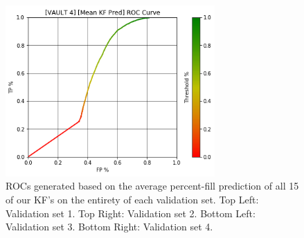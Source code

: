 \begin{figure}[h]
\includegraphics[width=8cm]{body/results/Graphs/JustSeries/1.PerformaceofMean/1.KF/Raw/v4.png}
\caption{ROCs generated based on the average percent-fill prediction of all 15 of our KF's on the entirety of each validation set. Top Left: Validation set 1. Top Right: Validation set 2. Bottom Left: Validation set 3. Bottom Right: Validation set 4.}
\label{fig:averageKF0}
\end{figure}

\pagebreak

